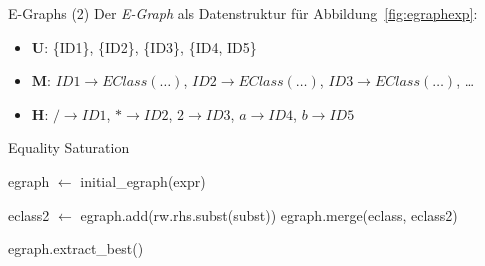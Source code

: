 \begin{frame}{E-Graphs (2)}
Der \textit{E-Graph} als Datenstruktur für Abbildung~\ref{fig:egraphexp}: \vspace{5mm}

\begin{itemize}
  \item $\mathbf{U}$: \{ID1\}, \{ID2\}, \{ID3\}, \{ID4, ID5\} 
  \item $\mathbf{M}$: $ID1 \rightarrow EClass(\ldots)$, $ID2 \rightarrow EClass(\ldots)$, $ID3 \rightarrow EClass(\ldots)$, \ldots 
  \item $\mathbf{H}$: $/ \rightarrow ID1$, $* \rightarrow ID2$, $2 \rightarrow ID3$, $a \rightarrow ID4$, $b \rightarrow ID5$
\end{itemize}
\end{frame}

\begin{frame}{Equality Saturation}
    \begin{algorithm}[H]
        \caption{Traditioneller Equality Saturation Workflow nach~\cite{2021-egg}}\label{alg:eqsat} %
        \begin{algorithmic}
          \State egraph $\gets$ initial\_egraph(expr)
            
            
                \State  eclass2 $\gets$ egraph.add(rw.rhs.subst(subst))
                \State egraph.merge(eclass, eclass2)
              \EndFor 
            \EndFor
          \EndWhile
      
          \State \Return egraph.extract\_best()
          \EndFunction
        \end{algorithmic}
    \end{algorithm}
\end{frame}